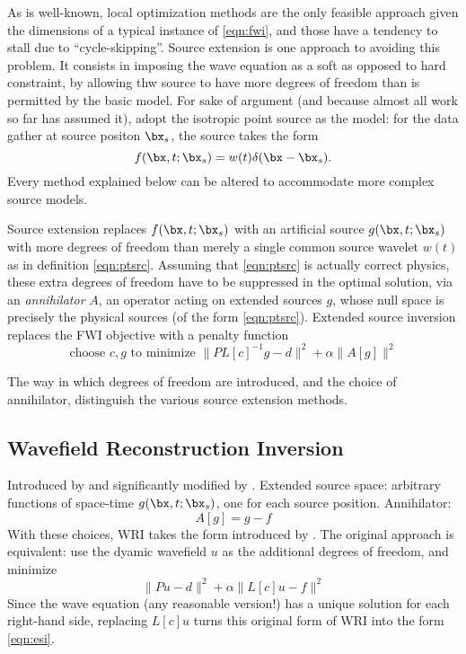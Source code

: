 As is well-known, local optimization methods are the only feasible approach given the dimensions of a typical instance of \ref{eqn:fwi}, and those have a tendency to stall due to ``cycle-skipping''. Source extension is one approach to avoiding this problem. It consists in imposing the wave equation as a soft as opposed to hard constraint, by allowing thw source to have more degrees of freedom than is permitted by the basic model. For sake of argument (and because almost all work so far has assumed it), adopt the isotropic point source as the model: for the data gather at source positon $\bx_s$, the source takes the form
\begin{equation}
\label{eqn:ptsrc}
f(\bx,t;\bx_s) = w(t)\delta(\bx-\bx_s).
\end{equation}
Every method explained below can be altered to accommodate more complex source models.

Source extension replaces $f(\bx,t;\bx_s)$ with an artificial source $g(\bx,t; \bx_s)$ with more degrees of freedom than merely a single common source wavelet $w(t)$ as in definition \ref{eqn:ptsrc}. Assuming that \ref{eqn:ptsrc} is actually correct physics, these extra degrees of freedom have to be suppressed in the optimal solution, via an {\em annihilator} $A$, an operator acting on extended sources $g$, whose null space is precisely the physical sources (of the form \ref{eqn:ptsrc}). Extended source inversion replaces the FWI objective with a penalty function
\begin{equation}
\label{eqn:esi}
\mbox{choose } c, g \mbox{ to minimize } \|PL[c]^{-1}g -d \|^2 + \alpha \|A[g]\|^2 
\end{equation}

The way in which degrees of freedom are introduced, and the choice of annihilator, distinguish the various source extension methods.

\subsection{Wavefield Reconstruction Inversion}
Introduced by \cite{LeeuwenHerrmannWRI:13} and significantly modified by \cite{WangYingst:SEG16}. Extended source space: arbitrary functions of space-time $g(\bx,t;\bx_s)$, one for each source position. Annihilator: 
\begin{equation}
\label{eqn:wri}
A[g] = g-f
\end{equation}
With these choices, WRI takes the form introduced by \cite{WangYingst:SEG16}. The original approach is equivalent: \cite{LeeuwenHerrmannWRI:13} use the dyamic wavefield $u$ as the additional degrees of freedom, and minimize
\[
\|Pu-d\|^2 + \alpha \|L[c]u-f\|^2
\]
Since the wave equation (any reasonable version!) has a unique solution for each right-hand side, replacing $L[c]u$ turns this original form of WRI into the form \ref{eqn:esi}.

